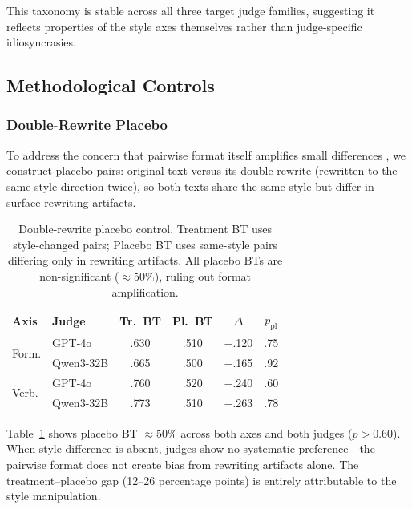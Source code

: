 \documentclass[11pt]{article}
\begin{document}
This taxonomy is stable across all three target judge families, suggesting it reflects properties of the style axes themselves rather than judge-specific idiosyncrasies.

\subsection{Methodological Controls}
\label{sec:controls}

\subsubsection{Double-Rewrite Placebo}
\label{sec:placebo}

To address the concern that pairwise format itself amplifies small differences \citep{jeong2025comparative}, we construct placebo pairs: original text versus its double-rewrite (rewritten to the same style direction twice), so both texts share the same style but differ in surface rewriting artifacts.

\begin{table}[t]
\centering
\small
\setlength{\tabcolsep}{3pt}
\begin{tabular}{llcccc}
\toprule
\textbf{Axis} & \textbf{Judge} & \textbf{Tr.\ BT} & \textbf{Pl.\ BT} & \textbf{$\Delta$} & \textbf{$p_\text{pl}$} \\
\midrule
\multirow{2}{*}{Form.}
& GPT-4o    & .630 & .510 & $-$.120 & .75 \\
& Qwen3-32B & .665 & .500 & $-$.165 & .92 \\
\midrule
\multirow{2}{*}{Verb.}
& GPT-4o    & .760 & .520 & $-$.240 & .60 \\
& Qwen3-32B & .773 & .510 & $-$.263 & .78 \\
\bottomrule
\end{tabular}
\caption{Double-rewrite placebo control. Treatment BT uses style-changed pairs; Placebo BT uses same-style pairs differing only in rewriting artifacts. All placebo BTs are non-significant ($\approx 50\%$), ruling out format amplification.}
\label{tab:placebo}
\end{table}

Table~\ref{tab:placebo} shows placebo BT $\approx 50\%$ across both axes and both judges ($p > 0.60$).
When style difference is absent, judges show no systematic preference---the pairwise format does not create bias from rewriting artifacts alone.
The treatment--placebo gap (12--26 percentage points) is entirely attributable to the style manipulation.
\end{document}
